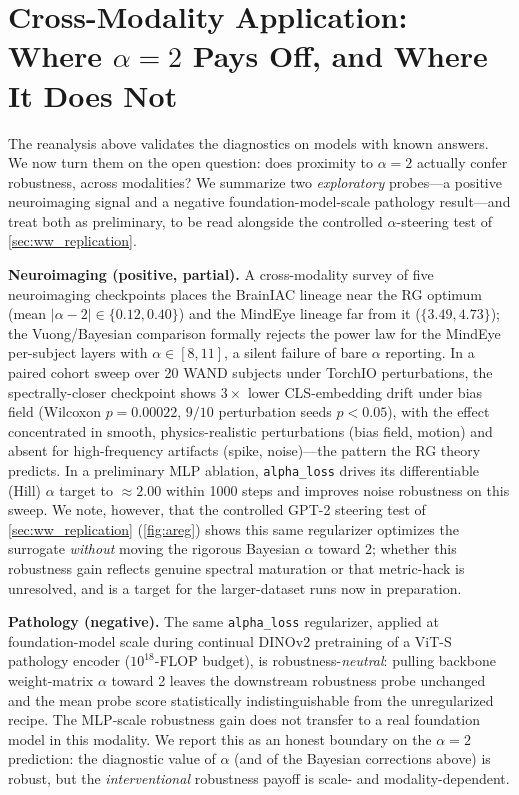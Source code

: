 \documentclass{article} %
\begin{document}


\section{Cross-Modality Application: Where $\alpha = 2$ Pays Off, and Where It Does Not}
\label{sec:crossmodality}

The reanalysis above validates the diagnostics on models with known answers. We now turn them on the
open question: does proximity to $\alpha = 2$ actually confer robustness, across modalities? We summarize
two \emph{exploratory} probes---a positive neuroimaging signal and a negative foundation-model-scale
pathology result---and treat both as preliminary, to be read alongside the controlled $\alpha$-steering
test of \cref{sec:ww_replication}.

\textbf{Neuroimaging (positive, partial).} A cross-modality survey of five neuroimaging checkpoints places
the BrainIAC lineage near the RG optimum (mean $|\alpha-2| \in \{0.12, 0.40\}$) and the MindEye lineage far
from it ($\{3.49, 4.73\}$); the Vuong/Bayesian comparison formally rejects the power law for the MindEye
per-subject layers with $\alpha \in [8,11]$, a silent failure of bare $\alpha$ reporting. In a paired cohort
sweep over 20 WAND subjects under TorchIO perturbations, the spectrally-closer checkpoint shows
$3\times$ lower CLS-embedding drift under bias field (Wilcoxon $p = 0.00022$, $9/10$ perturbation seeds
$p < 0.05$), with the effect concentrated in smooth, physics-realistic perturbations (bias field, motion)
and absent for high-frequency artifacts (spike, noise)---the pattern the RG theory predicts. In a
preliminary MLP ablation, \texttt{alpha\_loss} drives its differentiable (Hill) $\alpha$ target to
$\approx\!2.00$ within 1000 steps and improves noise robustness on this sweep. We note, however, that the
controlled GPT-2 steering test of \cref{sec:ww_replication} (\cref{fig:areg}) shows this same regularizer
optimizes the surrogate \emph{without} moving the rigorous Bayesian $\alpha$ toward $2$; whether this
robustness gain reflects genuine spectral maturation or that metric-hack is unresolved, and is a target for
the larger-dataset runs now in preparation.

\textbf{Pathology (negative).} The same \texttt{alpha\_loss} regularizer, applied at foundation-model scale
during continual DINOv2 pretraining of a ViT-S pathology encoder ($10^{18}$-FLOP budget), is
robustness-\emph{neutral}: pulling backbone weight-matrix $\alpha$ toward 2 leaves the downstream
robustness probe unchanged and the mean probe score statistically indistinguishable from the unregularized
recipe. The MLP-scale robustness gain does not transfer to a real foundation model in this modality. We
report this as an honest boundary on the $\alpha = 2$ prediction: the diagnostic value of $\alpha$ (and of
the Bayesian corrections above) is robust, but the \emph{interventional} robustness payoff is
scale- and modality-dependent.
\end{document}
